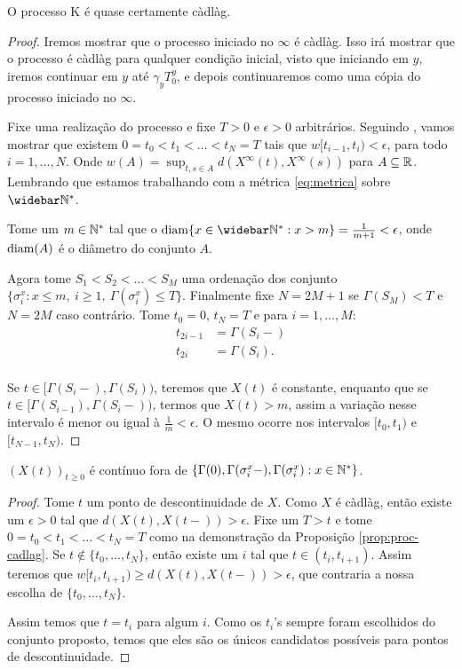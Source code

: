 \begin{proposicao}
  \label{prop:proc-cadlag}
  O processo K é quase certamente càdlàg.
\end{proposicao}
\begin{proof}

  Iremos mostrar que o processo iniciado no $\infty$ é càdlàg. Isso
  irá mostrar que o processo é càdlàg para qualquer condição inicial,
  visto que iniciando em $y$, iremos continuar em $y$ até $\gamma_y
  T^y_0$, e depois continuaremos como uma cópia do processo iniciado no
  $\infty$.

  Fixe uma realização do processo e fixe $T > 0$ e $\epsilon > 0$
  arbitrários. Seguindo \cite{billingsley:99}, vamos mostrar que
  existem $0 = t_0 < t_1 < \ldots < t_N = T$ tais que $w[t_{i-1}, t_i)
  < \epsilon$, para todo $i = 1, \ldots, N$. Onde $w(A) = \sup_{t, s
    \in A} d(X^\infty(t), X^\infty(s))$ para $A \subseteq
  {\mathbb{R}}$. Lembrando que estamos trabalhando com a métrica
  \eqref{eq:metrica} sobre $\Nzb$.

  Tome um $m \in {\mathbb{N^*}}$ tal que o $\diam\{x \in \Nzb: x > m \} =
  \frac{1}{m+1} < \epsilon$, onde ${\mathrm{diam}}(A)$ é o diâmetro do conjunto
  $A$.

  Agora tome $S_1 < S_2 < \ldots < S_M$ uma ordenação dos conjunto $\{
  \sigma^x_i: x \leq m, \: i \geq 1, \: \Gamma(\sigma^x_i) \leq
  T\}$. Finalmente fixe $N = 2M+1$ se $\Gamma(S_M) < T$ e $N = 2M$
  caso contrário. Tome $t_0 = 0$, $t_N = T$ e para $i=1,\ldots, M$:
  \begin{align*}
    t_{2i-1} &= \Gamma(S_i-)\\
    t_{2i} &= \Gamma(S_i).\\
  \end{align*}

  Se $t \in [\Gamma(S_i-), \Gamma(S_i))$, teremos que
  $X(t)$ é constante, enquanto que se $t \in
  [\Gamma(S_{i-1}), \Gamma(S_{i}-))$, termos que
  $X(t) > m$, assim a variação nesse intervalo é menor ou igual
  à $\frac{1}{m} < \epsilon$. O mesmo ocorre nos intervalos $[t_0,
  t_1)$ e $[t_{N-1}, t_N)$.
\end{proof}

\begin{proposicao}
  \label{prop:proc-descontinuidades}
  $(X(t))_{t\geq 0}$ é \qc contínuo fora de $\{ \Gamma(0),
  \Gamma(\sigma_i^x-), \Gamma(\sigma_i^x): x \in {\mathbb{N^*}}\}$.
\end{proposicao}
\begin{proof}
  Tome $t$ um ponto de descontinuidade de $X$. Como $X$ é càdlàg,
  então existe um $\epsilon > 0$ tal que $d(X(t), X(t-)) > \epsilon$.
  Fixe um $T > t$ e tome $0 = t_0 < t_1 < \ldots < t_N = T$ como na
  demonstração da Proposição \ref{prop:proc-cadlag}. Se $t \not\in
  \{t_0, \ldots, t_N\}$, então existe um $i$ tal que $t \in (t_i,
  t_{i+1})$. Assim teremos que $w[t_i, t_{i+1}) \geq d(X(t), X(t-)) >
  \epsilon$, que contraria a nossa escolha de $\{t_0, \ldots, t_N\}$.

  Assim temos que $t = t_i$ para algum $i$. Como os $t_i$'s sempre
  foram escolhidos do conjunto proposto, temos que eles são os únicos
  candidatos possíveis para pontos de descontinuidade.
\end{proof}

